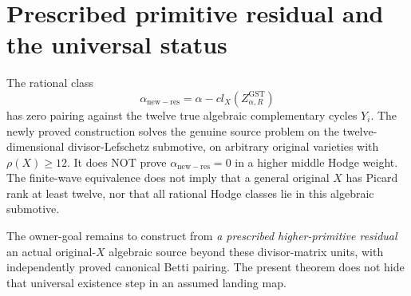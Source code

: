 \documentclass[11pt]{article}
\begin{document}
\section{Prescribed primitive residual and the universal status}

The rational class
\[
\alpha_{\mathrm{new-res}}=
\alpha-cl_X(Z_{\alpha,R}^{\mathrm{GST}})
\]
has zero pairing against the twelve true algebraic
complementary cycles $Y_i$.
The newly proved construction solves the genuine source
problem on the twelve-dimensional divisor-Lefschetz
submotive, on arbitrary original varieties with
$\rho(X)\ge12$. It does NOT prove
$\alpha_{\mathrm{new-res}}=0$ in a higher middle Hodge
weight. The finite-wave equivalence does not imply
that a general original $X$ has Picard rank at least
twelve, nor that all rational Hodge classes
lie in this algebraic submotive.

The owner-goal remains to construct from \emph{a
prescribed higher-primitive residual} an actual original-$X$
algebraic source beyond these divisor-matrix units,
with independently proved canonical Betti pairing.
The present theorem does not hide that universal
existence step in an assumed landing map.
\end{document}
